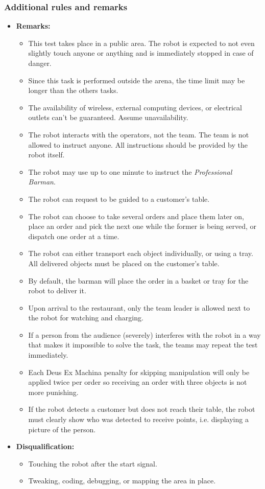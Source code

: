 \subsubsection*{Additional rules and remarks}
\begin{itemize}
	\item \textbf{Remarks:}
	\begin{itemize}
		\item This test takes place in a public area. The robot is expected to not even slightly touch anyone or anything and is immediately stopped in case of danger.
		\item Since this task is performed outside the arena, the time limit may be longer than the others tasks.
		\item The availability of wireless, external computing devices, or electrical outlets can't be guaranteed. Assume unavailability.
		\item The robot interacts with the operators, not the team. The team is not allowed to instruct anyone. All instructions should be provided by the robot itself.
		\item The robot may use up to one minute to instruct the \textit{Professional Barman}.
		\item The robot can request to be guided to a customer's table.
		\item The robot can choose to take several orders and place them later on, place an order and pick the next one while the former is being served, or dispatch one order at a time.
		\item The robot can either transport each object individually, or using a tray. All delivered objects must be placed on the customer's table.
		\item By default, the barman will place the order in a basket or tray for the robot to deliver it.
		\item Upon arrival to the restaurant, only the team leader is allowed next to the robot for watching and charging.
		\item If a person from the audience (severely) interferes with the robot in a way that makes it impossible to solve the task, the teams may repeat the test immediately.
		\item Each Deus Ex Machina penalty for skipping manipulation will only be applied twice per order so receiving an order with three objects is not more punishing.
		\item If the robot detects a customer but does not reach their table, the robot must clearly show who was detected to receive points, i.e. displaying a picture of the person.
	\end{itemize}
	\item \textbf{Disqualification:}
	\begin{itemize}
		\item Touching the robot after the start signal.
		\item Tweaking, coding, debugging, or mapping the area in place.
	\end{itemize}
\end{itemize}

